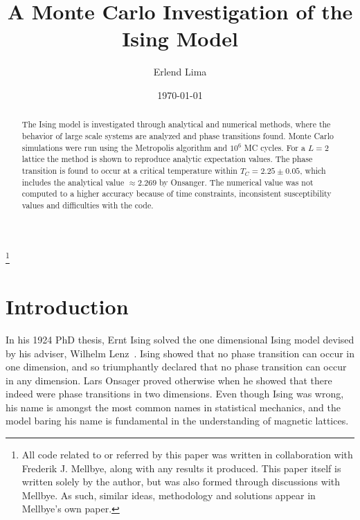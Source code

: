 \documentclass[aps,reprint]{revtex4-1}
\begin{document}
\title{A Monte Carlo Investigation of the Ising Model}
\author{Erlend Lima}
\thanks{All code related to or referred by this paper was written in
  collaboration with Frederik J. Mellbye, along with any results it produced.
  This paper itself is written solely by the author, but was also formed through discussions with Mellbye.
 As such, similar ideas, methodology and solutions appear in Mellbye's own paper.}
\date{\today}

\begin{abstract}
  
The Ising model is investigated through analytical and numerical methods, where
the behavior of large scale systems are analyzed and phase transitions
found. Monte Carlo simulations were run using the Metropolis algorithm and \(10^{6}\) MC
cycles. For a $L = 2$ lattice the method is shown to reproduce analytic
expectation values. The phase transition is found to occur at a critical temperature
within $T_C = 2.25 \pm 0.05$, which includes the analytical value $\approx 2.269$ by Onsanger.
The numerical value was not computed to a higher accuracy because of time
constraints, inconsistent susceptibility values and difficulties with the code.

\end{abstract}
\maketitle
\tableofcontents
\makeatletter
\let\toc@pre\relax
\let\toc@post\relax
\makeatother

\newpage

\section{Introduction}
\label{sec:introduction}

In his 1924 PhD thesis, Ernt Ising 
solved the one dimensional Ising model devised by his adviser, Wilhelm
Lenz~\cite{weicai}. Ising showed that no phase transition can occur in one
dimension, and so triumphantly declared that no phase transition can occur in
any dimension. Lars Onsager proved otherwise when he showed that there indeed
were phase transitions in two dimensions. Even though Ising was wrong, his name
is amongst the most common names in statistical mechanics, and the model baring
his name is fundamental in the understanding of magnetic lattices.
\end{document}
